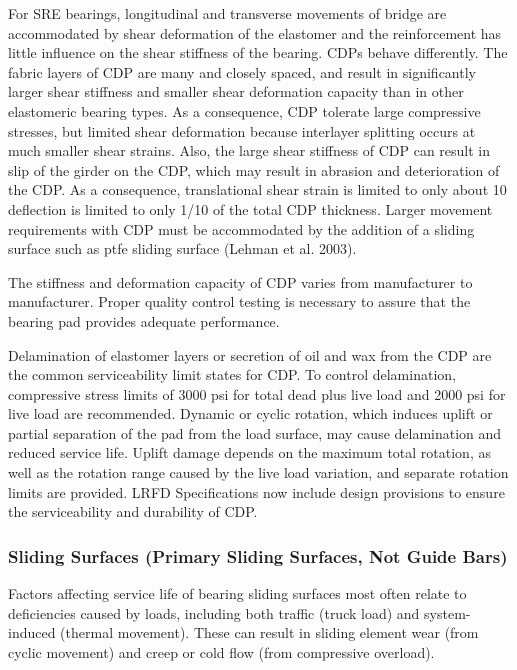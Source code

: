 For SRE bearings, longitudinal and transverse movements of bridge are accommodated by shear deformation of
the elastomer and the reinforcement has little influence on the shear stiffness of the bearing. CDPs behave differently.
The fabric layers of CDP are many and closely spaced, and result in significantly larger shear stiffness and smaller
shear deformation capacity than in other elastomeric bearing types. As a consequence, CDP tolerate large
compressive stresses, but limited shear deformation because interlayer splitting occurs at much smaller shear strains.
Also, the large shear stiffness of CDP can result in slip of the girder on the CDP, which may result in abrasion and
deterioration of the CDP. As a consequence, translational shear strain is limited to only about 10%
deflection is limited to only 1/10 of the total CDP thickness. Larger movement requirements with CDP must be
accommodated by the addition of a sliding surface such as \acrshort{ptfe} sliding surface (Lehman et al. 2003).

The stiffness and deformation capacity of CDP varies from manufacturer to manufacturer. Proper quality control
testing is necessary to assure that the bearing pad provides adequate performance.

Delamination of elastomer layers or secretion of oil and wax from the CDP are the common serviceability limit
states for CDP. To control delamination, compressive stress limits of 3000 psi for total dead plus live load and 2000
psi for live load are recommended. Dynamic or cyclic rotation, which induces uplift or partial separation of the pad
from the load surface, may cause delamination and reduced service life. Uplift damage depends on the maximum
total rotation, as well as the rotation range caused by the live load variation, and separate rotation limits are provided.
LRFD Specifications now include design provisions to ensure the serviceability and durability of CDP.

\subsubsection{Sliding Surfaces (Primary Sliding Surfaces, Not Guide Bars)}
Factors affecting service life of bearing sliding surfaces most often relate to deficiencies caused by loads,
including both traffic (truck load) and system-induced (thermal movement). These can result in sliding element wear
(from cyclic movement) and creep or cold flow (from compressive overload).

